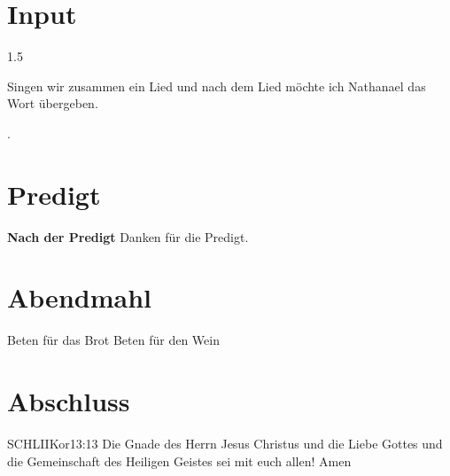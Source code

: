 \documentclass[fontsize=14pt]{mybib}
\newcommand{\Name}{Nathanael}
\begin{document}
\section{ Input }
\begin{spacing}{1.5}
    

    Singen wir zusammen ein Lied und nach dem Lied möchte ich \Name{} das Wort übergeben.

    .
   
\end{spacing}

\section{Predigt}
\textbf{Nach der Predigt}\newline
Danken für die Predigt.\newline
\section{Abendmahl}
Beten für das Brot\newline
Beten für den Wein\newline

\section{Abschluss}


\beten{}

\begin{bibelbox}{SCHL}{IIKor}{13:13}
    Die Gnade des Herrn Jesus Christus und die Liebe Gottes und die Gemeinschaft des Heiligen Geistes sei mit euch allen! Amen
\end{bibelbox}
\end{document}
